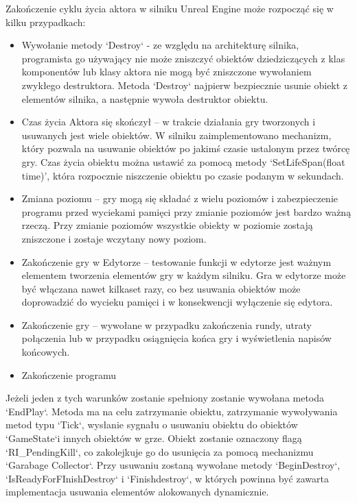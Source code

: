 \documentclass[12pt,twoside]{article}
\begin{document}
Zakończenie cyklu życia aktora w silniku Unreal Engine może rozpocząć się w
kilku przypadkach:
\begin{itemize}
\item Wywołanie metody `Destroy` - ze względu na architekturę silnika,
programista go używający nie może zniszczyć obiektów dziedziczących z klas
komponentów lub klasy aktora nie mogą być zniszczone wywołaniem zwykłego
destruktora. Metoda `Destroy` najpierw bezpiecznie usunie obiekt z elementów
silnika, a następnie wywoła destruktor obiektu.
\item Czas życia Aktora się skończył – w trakcie działania gry tworzonych i
usuwanych jest wiele obiektów. W silniku zaimplementowano mechanizm, który
pozwala na usuwanie obiektów po jakimś czasie ustalonym przez twórcę gry. Czas
życia obiektu można ustawić za pomocą metody ‘SetLifeSpan(float time)’, która
rozpocznie niszczenie obiektu po czasie podanym w sekundach.
\item Zmiana poziomu – gry mogą się składać z wielu poziomów i zabezpieczenie
programu przed wyciekami pamięci przy zmianie poziomów jest bardzo ważną rzeczą.
Przy zmianie poziomów wszystkie obiekty w poziomie zostają zniszczone i zostaje
wczytany nowy poziom. 
\item Zakończenie gry w Edytorze – testowanie funkcji w edytorze jest ważnym
elementem tworzenia elementów gry w każdym silniku. Gra w edytorze może być
włączana nawet kilkaset razy, co bez usuwania obiektów może doprowadzić do
wycieku pamięci i w konsekwencji wyłączenie się edytora. 
\item Zakończenie gry – wywołane w przypadku zakończenia rundy, utraty
połączenia lub w przypadku osiągnięcia końca gry i wyświetlenia napisów
końcowych. 
\item Zakończenie programu 
\end{itemize}

Jeżeli jeden z tych warunków zostanie spełniony zostanie wywołana metoda
`EndPlay`. Metoda ma na celu zatrzymanie obiektu, zatrzymanie wywoływania metod
typu `Tick`, wysłanie sygnału o usuwaniu obiektu do obiektów `GameState`i innych
obiektów w grze. Obiekt zostanie oznaczony flagą `RI\_PendingKill`, co
zakolejkuje go do usunięcia za pomocą mechanizmu `Garabage Collector`. Przy
usuwaniu zostaną wywołane metody `BeginDestroy`, `IsReadyForFInishDestroy` i
`Finishdestroy`, w których powinna być zawarta implementacja usuwania elementów
alokowanych dynamicznie.  
\end{document}
